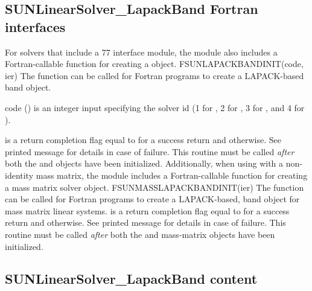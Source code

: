 \subsection{SUNLinearSolver\_LapackBand Fortran interfaces}
\label{ss:sunlinsol_lapband_fortran}

For solvers that include a {\F} 77 interface module, the {\sunlinsollapband}
module also includes a Fortran-callable function for creating a
 object.
%
%
{
  FSUNLAPACKBANDINIT(code, ier)
}
{
  The function  can be called for Fortran programs
  to create a LAPACK-based band  object.
}
{
  \begin{args}[code]
  \item[code] ()
    is an integer input specifying the solver id (1 for {\cvode}, 2
    for {\ida}, 3 for {\kinsol}, and 4 for {\arkode}).
  \end{args}
}
{
   is a return completion flag equal to  for a success
  return and  otherwise. See printed message for details in case
  of failure.
}
{
  This routine must be
  called \emph{after} both the {\nvector} and {\sunmatrix} objects have
  been initialized.
}
Additionally, when using {\arkode} with a non-identity
mass matrix, the {\sunlinsollapband} module includes a Fortran-callable
function for creating a  mass matrix solver
object.
%
%
{
  FSUNMASSLAPACKBANDINIT(ier)
}
{
  The function  can be called for Fortran programs
  to create a LAPACK-based, band  object for mass matrix linear
  systems.
}
{}
{
   is a  return completion flag equal to  for a success
  return and  otherwise. See printed message for details in case
  of failure.
}
{
  This routine must be
  called \emph{after} both the {\nvector} and {\sunmatrix} mass-matrix
  objects have been initialized.
}


\subsection{SUNLinearSolver\_LapackBand content}
\label{ss:sunlinsol_lapband_content}

